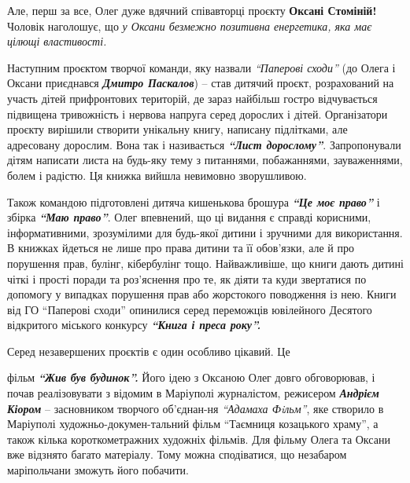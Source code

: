 Але, перш за все, Олег дуже вдячний співавторці проєкту \textbf{Оксані Стоміній!}
Чоловік наголошує, що \emph{у Оксани безмежно позитивна енергетика, яка має цілющі
властивості.}


Наступним проєктом творчої команди, яку назвали \emph{\enquote{Паперові сходи}} (до Олега і
Оксани приєднався \emph{\textbf{Дмитро Паскалов}}) – став дитячий проєкт, розрахований на
участь дітей прифронтових територій, де зараз найбільш гостро відчувається
підвищена тривожність і нервова напруга серед дорослих і дітей. Організатори
проєкту вирішили створити унікальну книгу, написану підлітками, але адресовану
дорослим. Вона так і називається \emph{\textbf{\enquote{Лист дорослому}}}. Запропонували дітям написати
листа на будь-яку тему з питаннями, побажаннями, зауваженнями, болем і радістю.
Ця книжка  вийшла невимовно зворушливою.

Також командою підготовлені дитяча кишенькова брошура \emph{\textbf{\enquote{Це моє право}}} і збірка
\emph{\textbf{\enquote{Маю право}}}. Олег впевнений, що ці видання є справді корисними, інформативними,
зрозумілими для будь-якої дитини і зручними для використання. В книжках йдеться
не лише про права дитини та її обов'язки, але й про порушення прав, булінг,
кібербулінг тощо. Найважливіше, що книги дають дитині чіткі і прості поради та
роз'яснення про те, як діяти та куди звертатися по допомогу у випадках
порушення прав або жорстокого поводження із нею. Книги від ГО \enquote{Паперові сходи}
опинилися серед переможців ювілейного Десятого відкритого міського конкурсу
\emph{\textbf{\enquote{Книга і преса року}.}}


Серед незавершених проєктів є один особливо цікавий. Це\par\noindent фільм \emph{\textbf{\enquote{Жив був
будинок}.}} Його ідею з Оксаною Олег довго обговорював, і почав реалізовувати з
відомим в Маріуполі журналістом, режисером \emph{\textbf{Андрієм Кіором}} – засновником
творчого об'єднан\hyp{}ня \emph{\enquote{Адамаха Фiльм}}, яке створило в Маріуполі
художньо-докумен\hyp{}тальний фільм \enquote{Таємниця козацького храму}, а також кілька
короткометражних художніх фільмів. Для фільму Олега та Оксани вже відзнято
багато матеріалу. Тому можна сподіватися, що незабаром маріпольчани зможуть
його побачити.

